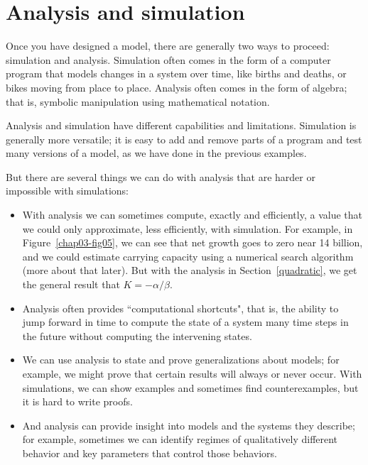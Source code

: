 \documentclass[12pt]{book}
\theoremstyle{exercise}
\begin{document}
\section{Analysis and simulation}

Once you have designed a model, there are generally two ways to proceed: simulation and analysis.  Simulation often comes in the form of a computer program that models changes in a system over time, like births and deaths, or bikes moving from place to place.  Analysis often comes in the form of algebra; that is, symbolic manipulation using mathematical notation.

Analysis and simulation have different capabilities and limitations.  Simulation is generally more versatile; it is easy to add and remove parts of a program and test many versions of a model, as we have done in the previous examples.

But there are several things we can do with analysis that are harder or impossible with simulations:

\begin{itemize}

\item With analysis we can sometimes compute, exactly and efficiently, a value that we could only approximate, less efficiently, with simulation.  For example, in Figure~\ref{chap03-fig05}, we can see that net growth goes to zero near 14 billion, and we could estimate carrying capacity using a numerical search algorithm (more about that later).  But with the analysis in Section~\ref{quadratic}, we get the general result that $K=-\alpha/\beta$.

\item Analysis often provides ``computational shortcuts", that is, the ability to jump forward in time to compute the state of a system many time steps in the future without computing the intervening states.

\item We can use analysis to state and prove generalizations about models; for example, we might prove that certain results will always or never occur.  With simulations, we can show examples and sometimes find counterexamples, but it is hard to write proofs.

\item And analysis can provide insight into models and the systems they describe; for example, sometimes we can identify regimes of qualitatively different behavior and key parameters that control those behaviors.

\end{itemize}
\end{document}
